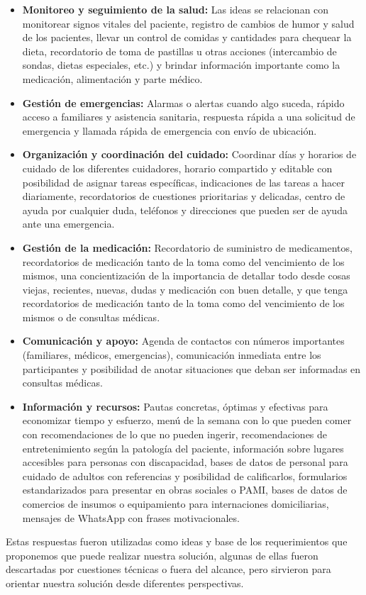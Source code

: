 \documentclass[a4paper,12pt]{article}
\begin{document}
    \begin{itemize}
        \item \textbf{Monitoreo y seguimiento de la salud:} Las ideas se relacionan con monitorear signos vitales del paciente, registro de cambios de humor y salud de los pacientes, llevar un control de comidas y cantidades para chequear la dieta, recordatorio de toma de pastillas u otras acciones (intercambio de sondas, dietas especiales, etc.) y brindar información importante como la medicación, alimentación y parte médico.
        \item \textbf{Gestión de emergencias:} Alarmas o alertas cuando algo suceda, rápido acceso a familiares y asistencia sanitaria, respuesta rápida a una solicitud de emergencia y llamada rápida de emergencia con envío de ubicación.
        \item \textbf{Organización y coordinación del cuidado:} Coordinar días y horarios de cuidado de los diferentes cuidadores, horario compartido y editable con posibilidad de asignar tareas específicas, indicaciones de las tareas a hacer diariamente, recordatorios de cuestiones prioritarias y delicadas, centro de ayuda por cualquier duda, teléfonos y direcciones que pueden ser de ayuda ante una emergencia.
        \item \textbf{Gestión de la medicación:} Recordatorio de suministro de medicamentos, recordatorios de medicación tanto de la toma como del vencimiento de los mismos, una concientización de la importancia de detallar todo desde cosas viejas, recientes, nuevas, dudas y medicación con buen detalle, y que tenga recordatorios de medicación tanto de la toma como del vencimiento de los mismos o de consultas médicas.
        \item \textbf{Comunicación y apoyo:} Agenda de contactos con números importantes (familiares, médicos, emergencias), comunicación inmediata entre los participantes y posibilidad de anotar situaciones que deban ser informadas en consultas médicas.
        \item \textbf{Información y recursos:} Pautas concretas, óptimas y efectivas para economizar tiempo y esfuerzo, menú de la semana con lo que pueden comer con recomendaciones de lo que no pueden ingerir, recomendaciones de entretenimiento según la patología del paciente, información sobre lugares accesibles para personas con discapacidad, bases de datos de personal para cuidado de adultos con referencias y posibilidad de calificarlos, formularios estandarizados para presentar en obras sociales o PAMI, bases de datos de comercios de insumos o equipamiento para internaciones domiciliarias, mensajes de WhatsApp con frases motivacionales.
    \end{itemize}
    \par Estas respuestas fueron utilizadas como ideas y base de los requerimientos que proponemos que puede realizar nuestra solución, algunas de ellas fueron descartadas por cuestiones técnicas o fuera del alcance, pero sirvieron para orientar nuestra solución desde diferentes perspectivas.
\end{document}
